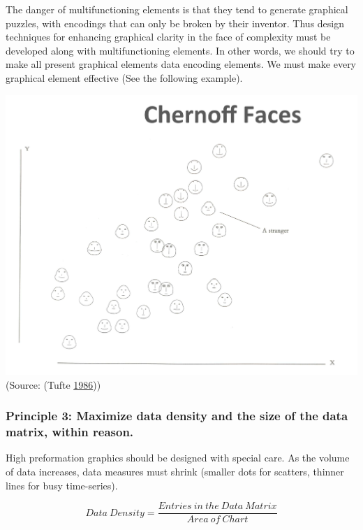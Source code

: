 \documentclass[]{book}
\begin{document}
The danger of multifunctioning elements is that they tend to generate graphical puzzles, with encodings that can only be broken by their inventor. Thus design techniques for enhancing graphical clarity in the face of complexity must be developed along with multifunctioning elements. In other words, we should try to make all present graphical elements data encoding elements. We must make every graphical element effective (See the following example).

\includegraphics{images/Tufte_figure6.png}
(Source: (Tufte \protect\hyperlink{ref-The-Visual-Display-of-Quantitative-Information}{1986}))

\hypertarget{principle-3-maximize-data-density-and-the-size-of-the-data-matrix-within-reason.}{%
\subsubsection{Principle 3: Maximize data density and the size of the data matrix, within reason.}\label{principle-3-maximize-data-density-and-the-size-of-the-data-matrix-within-reason.}}

High preformation graphics should be designed with special care. As the volume of data increases, data measures must shrink (smaller dots for scatters, thinner lines for busy time-series).

\[{Data \ Density} = \frac{{Entries \ in \ the \ Data \ Matrix}}{{Area \ of \ Chart}}\]
\end{document}
